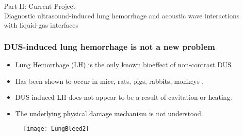 \begin{frame}
  \centering
  \begin{center}
    {\LARGE Part II: Current Project}\\
    
    Diagnostic ultrasound-induced lung hemorrhage and acoustic wave
    interactions with liquid-gas interfaces
  \end{center}
\end{frame}
\begin{frame} \frametitle{\vspace*{0.5cm}DUS-induced lung hemorrhage is not a new problem}
  {\small%
    \begin{itemize}%
    \item Lung Hemorrhage (LH) is the only known bioeffect of non-contrast DUS%
    \item Has been shown to occur in mice, rats, pigs, rabbits, monkeys \citep{Child1990,OBrien1997a,Tarantal1994a}.%
    \item DUS-induced LH does not appear to be a result of cavitation or heating.%
    \item The underlying physical damage mechanism is not understood.%
    \end{itemize}%
    \begin{figure}%
      \centering%
      \texttt{[image: LungBleed2]} \nocite{Miller2012}%
    \end{figure}%
  }
\end{frame}
